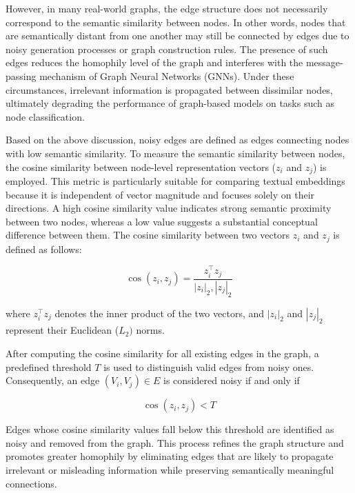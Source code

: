 \documentclass{article}
\begin{document}
However, in many real-world graphs, the edge structure does not necessarily correspond to the semantic similarity between nodes. In other words, nodes that are semantically distant from one another may still be connected by edges due to noisy generation processes or graph construction rules. The presence of such edges reduces the homophily level of the graph and interferes with the message-passing mechanism of Graph Neural Networks (GNNs). Under these circumstances, irrelevant information is propagated between dissimilar nodes, ultimately degrading the performance of graph-based models on tasks such as node classification.

Based on the above discussion, noisy edges are defined as edges connecting nodes with low semantic similarity. To measure the semantic similarity between nodes, the cosine similarity between node-level representation vectors (\(z_i\) and \(z_j\)) is employed. This metric is particularly suitable for comparing textual embeddings because it is independent of vector magnitude and focuses solely on their directions. A high cosine similarity value indicates strong semantic proximity between two nodes, whereas a low value suggests a substantial conceptual difference between them. The cosine similarity between two vectors \(z_i\) and \(z_j\) is defined as follows:

\begin{equation}
\cos(z_i, z_j) =
\frac{z_i^\top z_j}{|z_i|_2 , |z_j|_2}
\label{eq:cosine_similarity}
\end{equation}

where \(z_i^\top z_j\) denotes the inner product of the two vectors, and \( |z_i|_2 \) and \( |z_j|_2 \) represent their Euclidean (\( L_2) \) norms.

After computing the cosine similarity for all existing edges in the graph, a predefined threshold \(T \) is used to distinguish valid edges from noisy ones. Consequently, an edge \( (V_i, V_j) \in E \) is considered noisy if and only if

\begin{equation}
\cos(z_i, z_j) < T
\label{eq:threshold_condition}
\end{equation}

Edges whose cosine similarity values fall below this threshold are identified as noisy and removed from the graph. This process refines the graph structure and promotes greater homophily by eliminating edges that are likely to propagate irrelevant or misleading information while preserving semantically meaningful connections.
\end{document}
